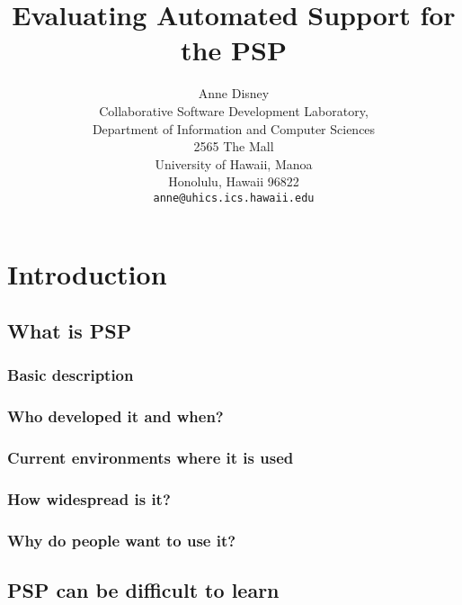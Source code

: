 



\title{Evaluating Automated Support for the PSP}
\author{Anne Disney\\
Collaborative Software Development Laboratory,\\
Department of Information and Computer Sciences\\
2565 The Mall\\
University of Hawaii, Manoa\\
Honolulu, Hawaii   96822\\
{\tt anne@uhics.ics.hawaii.edu}}
\maketitle

\setlength{\parindent}{0em}
\setlength{\parskip}{1ex}

\tableofcontents
\chapter{Introduction}
\section{What is PSP}
\subsection{Basic description}
\subsection{Who developed it and when?}
\subsection{Current environments where it is used}
\subsection{How widespread is it?}
\subsection{Why do people want to use it?}
\section{PSP can be difficult to learn}
